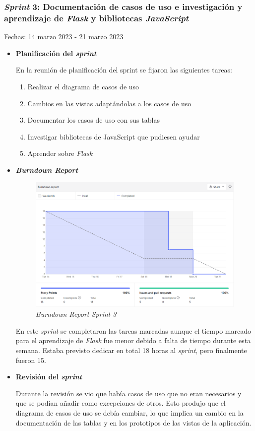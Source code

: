 \subsubsection{\textit{Sprint} 3: Documentación de casos de uso e investigación y aprendizaje de \textit{Flask} y bibliotecas \textit{JavaScript}}
Fechas: 14 marzo 2023 - 21 marzo 2023
\begin{itemize}
\item\textbf{Planificación del \textit{sprint}}

En la reunión de planificación del sprint se fijaron las siguientes tareas:
\begin{enumerate}
		\item Realizar el diagrama de casos de uso
		\item Cambios en las vistas adaptándolas a los casos de uso
		\item Documentar los casos de uso con sus tablas
		\item Investigar bibliotecas de JavaScript que pudiesen ayudar
		\item Aprender sobre \textit{Flask}
\end{enumerate}

\item\textbf{\textit{Burndown Report}}

\begin{figure}[h]
	\centering
	\includegraphics[width=\textwidth]{../img/Anexos/Sprints/Sprint3.png}
	\caption{\textit{Burndown Report Sprint 3}}
\end{figure}
\FloatBarrier
En este \textit{sprint} se completaron las tareas marcadas aunque el tiempo marcado para el aprendizaje de \textit{Flask} fue menor debido a falta de tiempo durante esta semana. Estaba previsto dedicar en total 18 horas al \textit{sprint}, pero finalmente fueron 15.

\item\textbf{Revisión del \textit{sprint}}

Durante la revisión se vio que había casos de uso que no eran necesarios y que se podían añadir como excepciones de otros. Esto produjo que el diagrama de casos de uso se debía cambiar, lo que implica un cambio en la documentación de las tablas y en los prototipos de las vistas de la aplicación.
\end{itemize}



